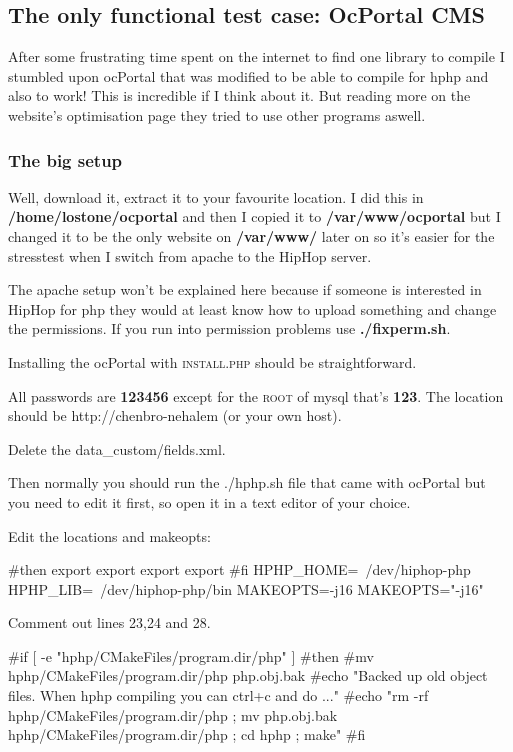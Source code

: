 \subsection{The only functional test case: OcPortal CMS}
After some frustrating time spent on the internet to find one library to compile I stumbled upon ocPortal that was modified to be able to compile for hphp and also to work! 
This is incredible if I think about it. But reading more on the website's optimisation page they tried to use other programs aswell.\cite{ocportal_optimise}

\subsubsection{The big setup}
Well, download it, extract it to your favourite location. 
I did this in \textbf{/home/lostone/ocportal} and then I copied it to \textbf{/var/www/ocportal} but I changed it to be the only website on \textbf{/var/www/} later on so it's easier for the stresstest when I switch from \gls{apache} to the HipHop server.

The \gls{apache} setup won't be explained here because if someone is interested in HipHop for \gls{php} they would at least know how to upload something and change the permissions. 
If you run into permission problems use \textbf{./fixperm.sh}.

Installing the ocPortal with \textsc{install.php} should be straightforward.

All passwords are \textbf{123456} except for the \textsc{root} of mysql that's \textbf{123}. The location should be http://chenbro-nehalem (or your own host).

Delete the data\_custom/fields.xml.

Then normally you should run the ./hphp.sh file that came with ocPortal but you need to edit it first, so open it in a text editor of your choice.

Edit the locations and makeopts:
\begin{codelisting}
#then
export
export
export
export
#fi
HPHP_HOME=~/dev/hiphop-php
HPHP_LIB=~/dev/hiphop-php/bin
MAKEOPTS=-j16
MAKEOPTS="-j16"
\end{codelisting}

Comment out lines 23,24 and 28.
\lstset{		firstline=23,	 }
\begin{codelisting}
#if [ -e "hphp/CMakeFiles/program.dir/php" ]
#then
#mv hphp/CMakeFiles/program.dir/php php.obj.bak
#echo "Backed up old object files. When hphp compiling you can ctrl+c and do ..."
#echo "rm -rf hphp/CMakeFiles/program.dir/php ; mv php.obj.bak hphp/CMakeFiles/program.dir/php ; cd hphp ; make"
#fi
\end{codelisting}


